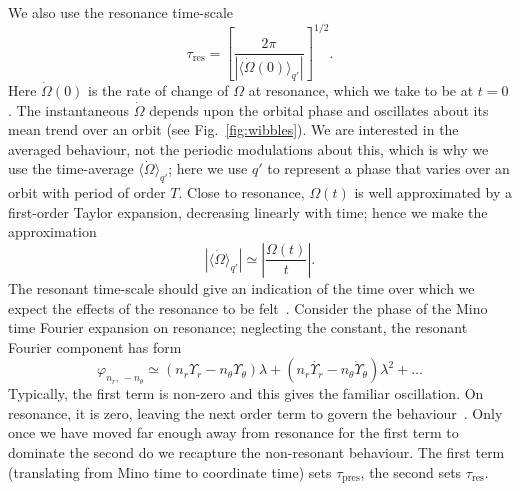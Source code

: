 \documentclass[aps,prd,amsfonts,amssymb,amsmath,nofootinbib,reprint,showpacs]{revtex4}
\newcommand{\figref}[1]{Fig.\ \ref{fig:#1}}
\newcommand{\sub}[1]{\ensuremath{_\text{#1}}}
\begin{document}
We also use the resonance time-scale
\begin{equation}
\tau\sub{res} = \left[\frac{2\pi}{\left|\langle\dot{\Omega}(0)\rangle_{q'}\right|}\right]^{1/2}.
\label{eq:t-res}
\end{equation}
Here $\dot{\Omega}(0)$ is the rate of change of $\Omega$ at resonance, which we take to be at $t = 0$. The instantaneous $\dot{\Omega}$ depends upon the orbital phase and oscillates about its mean trend over an orbit (see \figref{wibbles}). We are interested in the averaged behaviour, not the periodic modulations about this, which is why we use the time-average $\langle\dot{\Omega}\rangle_{q'}$; here we use $q'$ to represent a phase that varies over an orbit with period of order $T$. Close to resonance, $\Omega(t)$ is well approximated by a first-order Taylor expansion, decreasing linearly with time; hence we make the approximation
\begin{equation}
\left|\langle\dot{\Omega}\rangle_{q'}\right| \simeq \left|\frac{\Omega(t)}{t}\right|.
\end{equation}
The resonant time-scale should give an indication of the time over which we expect the effects of the resonance to be felt~\cite{Bosley1992}. Consider the phase of the Mino time Fourier expansion on resonance; neglecting the constant, the resonant Fourier component has form
\begin{equation}
\varphi_{n_r,\,-n_\theta} \simeq \left(n_r\Upsilon_r - n_\theta\Upsilon_\theta\right)\lambda + \left(n_r\dot{\Upsilon_r} - n_\theta\dot{\Upsilon}_\theta\right)\lambda^2 + \ldots
\end{equation}
Typically, the first term is non-zero and this gives the familiar oscillation. On resonance, it is zero, leaving the next order term to govern the behaviour~\cite{Flanagan2012}. Only once we have moved far enough away from resonance for the first term to dominate the second do we recapture the non-resonant behaviour. The first term (translating from Mino time to coordinate time) sets $\tau\sub{pres}$, the second sets $\tau\sub{res}$.
\end{document}
